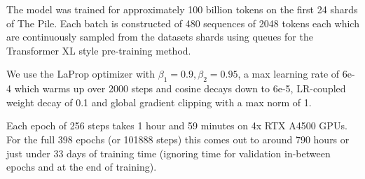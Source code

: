 The model was trained for approximately 100 billion tokens on the first 24 shards of The Pile. Each batch is constructed of 480 sequences of 2048 tokens each which are continuously sampled from the datasets shards using queues for the Transformer XL style pre-training method.

We use the LaProp optimizer \cite{ziyin2021laprop} with $\beta_1=0.9, \beta_2=0.95$, a max learning rate of 6e-4 which warms up over 2000 steps and cosine decays down to 6e-5, LR-coupled weight decay of 0.1 and global gradient clipping with a max norm of 1. 

Each epoch of 256 steps takes 1 hour and 59 minutes on 4x RTX A4500 GPUs. For the full 398 epochs (or 101888 steps) this comes out to around 790 hours or just under 33 days of training time (ignoring time for validation in-between epochs and at the end of training).